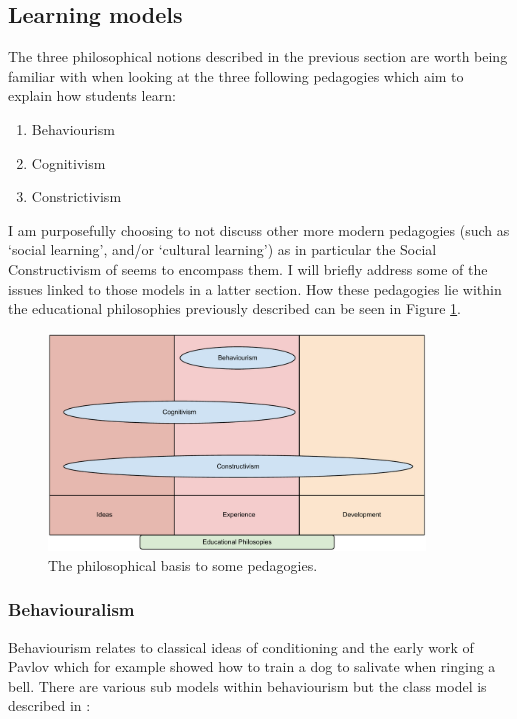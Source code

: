 \documentclass[a4paper,12pt]{article}
\begin{document}
\subsection{Learning models}

The three philosophical notions described in the previous section are worth being familiar with when looking at the three following pedagogies which aim to explain how students learn:

\begin{enumerate}
    \item Behaviourism
    \item Cognitivism
    \item Constrictivism
\end{enumerate}

I am purposefully choosing to not discuss other more modern pedagogies (such as `social learning', and/or `cultural learning') as in particular the Social Constructivism of \cite{Vygotsky1978a} seems to encompass them. I will briefly address some of the issues linked to those models in a latter section. How these pedagogies lie within the educational philosophies previously described can be seen in Figure \ref{Learning_Pedagogies}.

\begin{figure}[htdp]
    \begin{center}
        \includegraphics[width=10cm]{Images/Learning_Pedagogies.pdf}
    \end{center}
    \caption{The philosophical basis to some pedagogies.}
    \label{Learning_Pedagogies}
\end{figure}

\subsubsection{Behaviouralism}

Behaviourism relates to classical ideas of conditioning and the early work of Pavlov \cite{Pavlov2003a} which for example showed how to train a dog to salivate when ringing a bell. There are various sub models within behaviourism but the class model is described in \cite{Jordan2008a}:
\end{document}

